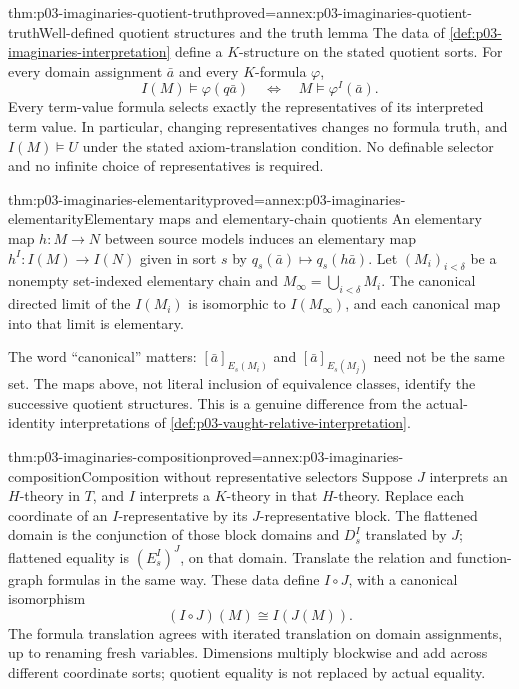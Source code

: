 \begin{hbtheorem}{thm:p03-imaginaries-quotient-truth}{proved=annex:p03-imaginaries-quotient-truth}{Well-defined quotient structures and the truth lemma}
The data of \cref{def:p03-imaginaries-interpretation} define a
\(K\)-structure on the stated quotient sorts. For every domain assignment
\(\bar a\) and every \(K\)-formula \(\varphi\),
\[
 I(M)\models\varphi(q\bar a)
       \quad\Longleftrightarrow\quad M\models\varphi^I(\bar a).
\]
Every term-value formula selects exactly the representatives of its interpreted
term value. In particular, changing representatives changes no formula truth,
and \(I(M)\models U\) under the stated axiom-translation condition.
No definable selector and no infinite choice of representatives is required.
\end{hbtheorem}

\begin{hbtheorem}{thm:p03-imaginaries-elementarity}{proved=annex:p03-imaginaries-elementarity}{Elementary maps and elementary-chain quotients}
An elementary map \(h:M\to N\) between source models induces an elementary
map \(h^I:I(M)\to I(N)\) given in sort \(s\) by
\(q_s(\bar a)\mapsto q_s(h\bar a)\).
Let \((M_i)_{i<\delta}\) be a nonempty set-indexed elementary chain and
\(M_\infty=\bigcup_{i<\delta}M_i\). The canonical directed limit of
the \(I(M_i)\) is isomorphic to \(I(M_\infty)\), and each canonical
map into that limit is elementary.
\end{hbtheorem}

The word ``canonical'' matters: \([\bar a]_{E_s(M_i)}\) and
\([\bar a]_{E_s(M_j)}\) need not be the same set. The maps above, not
literal inclusion of equivalence classes, identify the successive quotient
structures. This is a genuine difference from the actual-identity
interpretations of \cref{def:p03-vaught-relative-interpretation}.

\begin{hbtheorem}{thm:p03-imaginaries-composition}{proved=annex:p03-imaginaries-composition}{Composition without representative selectors}
Suppose \(J\) interprets an \(H\)-theory in \(T\), and \(I\)
interprets a \(K\)-theory in that \(H\)-theory. Replace each coordinate
of an \(I\)-representative by its \(J\)-representative block. The
flattened domain is the conjunction of those block domains and \(D_s^I\)
translated by \(J\); flattened equality is \((E_s^I)^J\), on that
domain. Translate the relation and function-graph formulas in the same way.
These data define \(I\circ J\), with a canonical isomorphism
\[
                 (I\circ J)(M)\cong I(J(M)).
\]
The formula translation agrees with iterated translation on domain assignments,
up to renaming fresh variables. Dimensions multiply blockwise and add across
different coordinate sorts; quotient equality is not replaced by actual equality.
\end{hbtheorem}

